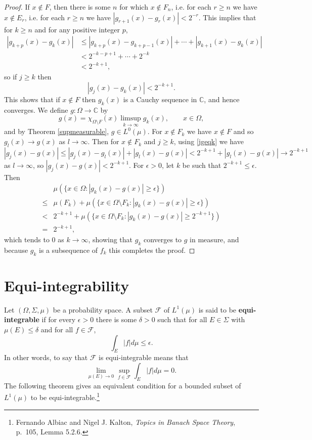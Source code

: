 \documentclass{article}
\theoremstyle{definition}
\theoremstyle{definition}
\begin{document}
\begin{proof}
If $x \not \in F$, then there is some $n$ for which $x \not \in F_n$, i.e.
for each $r \geq n$ we have $x \not \in E_r$, i.e.
for each $r \geq n$ we have $|g_{r+1}(x)-g_r(x)| < 2^{-r}$. 
This implies that for $k \geq n$ and for any positive integer $p$,
\begin{align*}
|g_{k+p}(x)-g_k(x)| &\leq |g_{k+p}(x)-g_{k+p-1}(x)|
+ \cdots + |g_{k+1}(x)-g_k(x)|\\
&<2^{-k-p+1}+\cdots+2^{-k}\\
&<2^{-k+1},
\end{align*}
so if $j \geq k$ then
\begin{equation}
|g_j(x)-g_k(x)| < 2^{-k+1}.
\label{jgeqk}
\end{equation}
This shows that if $x \not \in F$ then $g_k(x)$ is a Cauchy sequence in $\mathbb{C}$, and hence converges.
We define $g:\Omega \to \mathbb{C}$
by
\[
g(x)=\chi_{\Omega \setminus F}(x) \limsup_{k \to \infty} g_k(x), \qquad x \in \Omega,
\]
and by Theorem \ref{supmeasurable}, $g \in L^0(\mu)$.
For $x \not \in F_k$ we have $x \not \in F$ and
so $g_l(x) \to g(x)$ as $l \to \infty$. Then for $x \not \in F_k$ and $j \geq k$, using \eqref{jgeqk} we have
\[
|g_j(x)-g(x)| \leq |g_j(x)-g_l(x)| + |g_l(x)-g(x)| < 2^{-k+1} + |g_l(x)-g(x)| \to 2^{-k+1}
\]
as $l \to \infty$,
so $|g_j(x)-g(x)| < 2^{-k+1}$. For $\epsilon>0$, let $k$ be such that $2^{-k+1}\leq \epsilon$. Then
\[
\begin{split}
&\mu(\{x \in \Omega: |g_k(x)-g(x)| \geq \epsilon\})\\
\leq& \mu(F_k)+
\mu(\{x \in \Omega \setminus F_k: |g_k(x)-g(x)| \geq \epsilon\})\\
<&2^{-k+1}
 + \mu(\{x \in \Omega \setminus F_k: |g_k(x)-g(x)| \geq 2^{-k+1}\})\\
=&2^{-k+1},
\end{split}
\]
which tends to $0$ as $k \to \infty$, showing that $g_k$ converges to $g$ in measure, and because $g_k$ is a subsequence of $f_k$ this
completes the proof.
\end{proof}



\section{Equi-integrability}
Let $(\Omega,\Sigma,\mu)$ be a probability  space. A subset $\mathscr{F}$ of $L^1(\mu)$ is said to be
\textbf{equi-integrable} if for every $\epsilon>0$ there is some $\delta>0$ such that for all
$E \in \Sigma$ with $\mu(E) \leq \delta$ and for all $f \in \mathscr{F}$,
\[
\int_E |f| d\mu  \leq \epsilon.
\]
In other words, to say that $\mathscr{F}$ is equi-integrable means that
\[
\lim_{\mu(E) \to 0} \sup_{f \in \mathscr{F}} \int_E |f| d\mu = 0.
\]
The following theorem gives an equivalent condition for a bounded subset of $L^1(\mu)$
to be equi-integrable.\footnote{Fernando Albiac and
Nigel J. Kalton, {\em Topics in Banach Space Theory}, p.~105, Lemma 5.2.6.}
\end{document}
